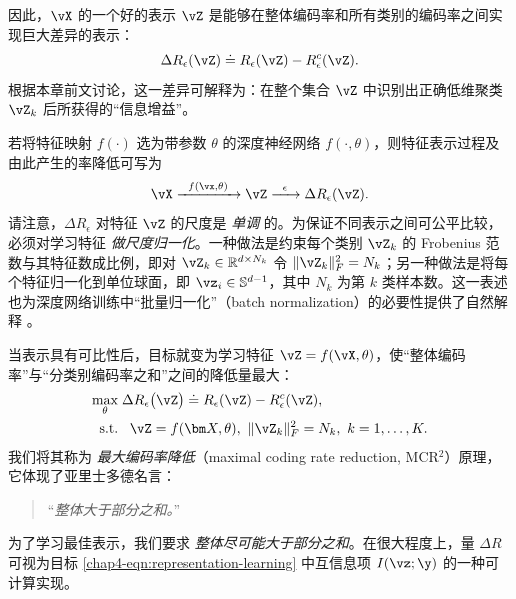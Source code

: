\documentclass[../../book-main_zh.tex]{subfiles}
\begin{document}
因此，$\vX$ 的一个好的表示 $\vZ$ 是能够在整体编码率和所有类别的编码率之间实现巨大差异的表示：
\begin{equation}
    \Delta R_{\epsilon}(\vZ) \doteq R_{\epsilon}(\vZ) - R_{\epsilon}^c(\vZ).
    \label{chap4-eqn:coding-length-reduction}
\end{equation}
根据本章前文讨论，这一差异可解释为：在整个集合 $\vZ$ 中识别出正确低维聚类 $\vZ_k$ 后所获得的“信息增益”。

若将特征映射 $f(\cdot)$ 选为带参数 $\theta$ 的深度神经网络 $f(\cdot,\theta)$，则特征表示过程及由此产生的率降低可写为
\begin{equation}
    \vX
    \xrightarrow{\hspace{2mm} f(\vx, \theta)\hspace{2mm}} \vZ
    \xrightarrow{\hspace{2mm} \epsilon \hspace{2mm}} \Delta
    R_{\epsilon}(\vZ).
    \label{chap4-eqn:flow}
\end{equation}
请注意，$\Delta R_{\epsilon}$ 对特征 $\vZ$ 的尺度是 {\em 单调} 的。为保证不同表示之间可公平比较，必须对学习特征 {\em 做尺度归一化}。一种做法是约束每个类别 $\vZ_k$ 的 Frobenius 范数与其特征数成比例，即对 $\vZ_k \in \mathbb R^{d \times N_k}$ 令 $\|\vZ_k\|_F^2 = N_k$；另一种做法是将每个特征归一化到单位球面，即 $\vz_i \in \mathbb{S}^{d-1}$，其中 $N_k$ 为第 $k$ 类样本数。这一表述也为深度网络训练中“批量归一化”（batch normalization）的必要性提供了自然解释 \cite{ioffe2015batch}。%

当表示具有可比性后，目标就变为学习特征 $\vZ  = f(\vX, \theta)$，使“整体编码率”与“分类别编码率之和”之间的降低量最大：
\begin{equation}
    \begin{aligned}
        \max_{\theta } & \;  \Delta R_{\epsilon}\big(\vZ \big) \doteq
        R_{\epsilon}(\vZ) - R_{\epsilon}^c(\vZ ), \\
        \mbox{s.t.} & \ \ \, \vZ = f(\bm X, \theta),\  \|\vZ_k\|_F^2
        = N_k,\ k=1,\dots,K.
    \end{aligned}
    \label{eqn:maximal-rate-reduction}
\end{equation}
我们将其称为 {\em 最大编码率降低}（maximal coding rate reduction, MCR$^2$）原理，它体现了亚里士多德名言：
\begin{quote}
    \centering
    “{\em 整体大于部分之和。}”
\end{quote}
为了学习最佳表示，我们要求 {\em 整体尽可能大于部分之和}。在很大程度上，量 $\Delta R$ 可视为目标 \eqref{chap4-eqn:representation-learning} 中互信息项 $I(\vz; \y)$ 的一种可计算实现。
\end{document}
